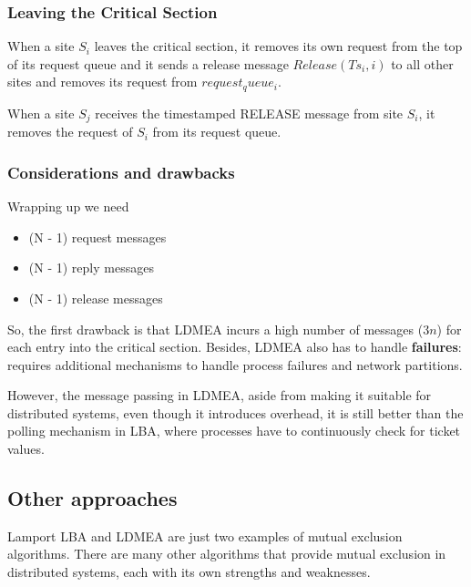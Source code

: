 \subsubsection{Leaving the Critical Section}
When a site $S_i$ leaves the critical section, it removes its own request from the top of its request queue and it sends a release message $Release(Ts_i, i)$ to all other sites and removes its request from $request_queue_i$.

When a site $S_j$ receives the timestamped RELEASE message from site $S_i$, it removes the request of $S_i$ from its request queue.

\subsubsection{Considerations and drawbacks}

Wrapping up we need
\begin{itemize}
   \item (N - 1) request messages
   \item (N - 1) reply messages
   \item (N - 1) release messages
\end{itemize}
So, the first drawback is that LDMEA incurs a high number of messages ($3n$) for each entry into the critical section. 
Besides, LDMEA also has to handle \textbf{failures}: requires additional mechanisms to handle process failures and network partitions.

However, the message passing in LDMEA, aside from making it suitable for distributed systems, even though it introduces overhead, it is still better than the polling mechanism in LBA, where processes have to continuously check for ticket values.

\subsection{Other approaches}
Lamport LBA and LDMEA are just two examples of mutual exclusion algorithms. There are many other algorithms that provide mutual exclusion in distributed systems, each with its own strengths and weaknesses.

